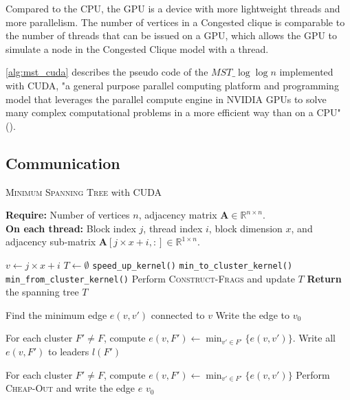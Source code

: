 \documentclass[english, 12pt, a4paper, elec, utf8, a-2b, online]{aaltothesis}
\newcommand{\mstalgo}{$MST\_\log\log{n}$}
\begin{document}
Compared to the CPU, the GPU is a device with more lightweight threads and more parallelism. The number of vertices in a Congested clique is comparable to the number of threads that can be issued on a GPU,
which allows the GPU to simulate a node in the Congested Clique model with a thread.

\cref{alg:mst_cuda} describes the pseudo code of the \mstalgo{} implemented with CUDA, "a general purpose parallel computing platform and programming model that leverages the parallel compute engine in NVIDIA GPUs to solve many complex computational problems in a more efficient way than on a CPU" (\cite{CUDA}).
\subsection{Communication}
\begin{algorithm}
	\caption{\textsc{Minimum Spanning Tree} with CUDA}
	\label{alg:mst_cuda}
	\textbf{Require:} Number of vertices $n$, adjacency matrix $\mathbf{A} \in \mathbb{R}^{n \times n}$.\\
	\textbf{On each thread:} Block index $j$, thread index $i$, block dimension $x$, and adjacency sub-matrix $\mathbf{A}[j \times x + i, :] \in \mathbb{R}^{1 \times n}$.
	\begin{algorithmic}[1]
		\State $v \gets j \times x + i$
		\State $T \gets \emptyset$
				\State \texttt{speed\_up\_kernel()}
			\Else
				\State \texttt{min\_to\_cluster\_kernel()}
				\State \texttt{min\_from\_cluster\_kernel()}
			\EndIf
			\State Perform \textsc{Construct-Frags} and update $T$
		\EndWhile
		\State \textbf{Return} the spanning tree $T$

		\State
			\State Find the minimum edge $e(v, v')$ connected to $v$
			\State Write the edge to $v_0$
		\EndFunction

		\State
		\State For each cluster $F' \neq F$, compute $e(v, F') \gets \min_{v' \in F'} \{ e(v, v') \}$.
		\State Write all $e(v, F')$ to leaders $l(F')$
		\EndFunction

		\State
		\State For each cluster $F' \neq F$, compute $e(v, F') \gets \min_{v' \in F'} \{ e(v, v') \}$
		\State Perform \textsc{Cheap-Out} and write the edge $e$ $v_0$
		\EndFunction
	\end{algorithmic}
\end{algorithm}
\end{document}
